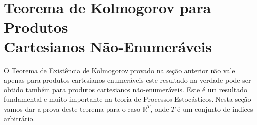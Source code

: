 \section[Teorema de Kolmogorov para Produtos Cartesianos Não-Enumeráveis]
{Teorema de Kolmogorov para Produtos \\Cartesianos Não-Enumeráveis}

O Teorema de Existência de Kolmogorov 
provado na seção anterior não vale apenas
para produtos cartesianos enumeráveis este resultado na verdade
pode ser obtido também para produtos
cartesianos não-enumeráveis. Este é um resultado fundamental e muito 
importante na teoria de Processos Estocásticos. Nesta seção 
vamos dar a prova deste teorema para o caso $\mathbb{R}^T$,
onde $T$ é um conjunto de índices arbitrário. 